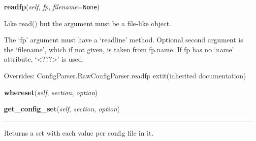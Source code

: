    \vspace{0.5ex}

\hspace{.8\funcindent}\begin{boxedminipage}{\funcwidth}

    \raggedright \textbf{readfp}(\textit{self}, \textit{fp}, \textit{filename}={\tt None})

\setlength{\parskip}{2ex}
    Like read() but the argument must be a file-like object.

    The `fp' argument must have a `readline' method.  Optional second 
    argument is the `filename', which if not given, is taken from fp.name.
    If fp has no `name' attribute, `{\textless}???{\textgreater}' is used.

\setlength{\parskip}{1ex}
      Overrides: ConfigParser.RawConfigParser.readfp 	extit{(inherited documentation)}

    \end{boxedminipage}

    \label{util:LayerConfigParser:whereset}

    \vspace{0.5ex}

\hspace{.8\funcindent}\begin{boxedminipage}{\funcwidth}

    \raggedright \textbf{whereset}(\textit{self}, \textit{section}, \textit{option})

\setlength{\parskip}{2ex}
\setlength{\parskip}{1ex}
    \end{boxedminipage}

    \label{util:LayerConfigParser:get_config_set}

    \vspace{0.5ex}

\hspace{.8\funcindent}\begin{boxedminipage}{\funcwidth}

    \raggedright \textbf{get\_config\_set}(\textit{self}, \textit{section}, \textit{option})

    \vspace{-1.5ex}

    \rule{\textwidth}{0.5\fboxrule}
\setlength{\parskip}{2ex}
    Returns a set with each value per config file in it.

\setlength{\parskip}{1ex}
    \end{boxedminipage}


